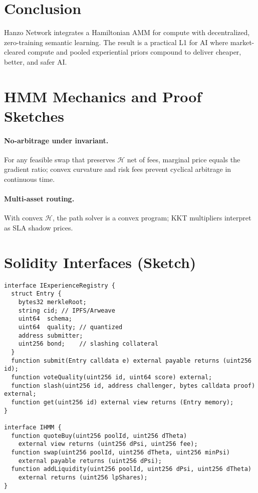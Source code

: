 \documentclass[11pt]{article}
\begin{document}
\section{Conclusion}
Hanzo Network integrates a Hamiltonian AMM for compute with decentralized, zero-training semantic learning. The result is a practical L1 for AI where market-cleared compute and pooled experiential priors compound to deliver cheaper, better, and safer AI.

\appendix
\section{HMM Mechanics and Proof Sketches}
\paragraph{No-arbitrage under invariant.} For any feasible swap that preserves \(\mathcal H\) net of fees, marginal price equals the gradient ratio; convex curvature and risk fees prevent cyclical arbitrage in continuous time.

\paragraph{Multi-asset routing.} With convex \(\mathcal H\), the path solver is a convex program; KKT multipliers interpret as SLA shadow prices.

\section{Solidity Interfaces (Sketch)}
\begin{verbatim}
interface IExperienceRegistry {
  struct Entry {
    bytes32 merkleRoot;
    string cid; // IPFS/Arweave
    uint64  schema;
    uint64  quality; // quantized
    address submitter;
    uint256 bond;    // slashing collateral
  }
  function submit(Entry calldata e) external payable returns (uint256 id);
  function voteQuality(uint256 id, uint64 score) external;
  function slash(uint256 id, address challenger, bytes calldata proof) external;
  function get(uint256 id) external view returns (Entry memory);
}

interface IHMM {
  function quoteBuy(uint256 poolId, uint256 dTheta)
    external view returns (uint256 dPsi, uint256 fee);
  function swap(uint256 poolId, uint256 dTheta, uint256 minPsi)
    external payable returns (uint256 dPsi);
  function addLiquidity(uint256 poolId, uint256 dPsi, uint256 dTheta)
    external returns (uint256 lpShares);
}
\end{verbatim}
\end{document}

